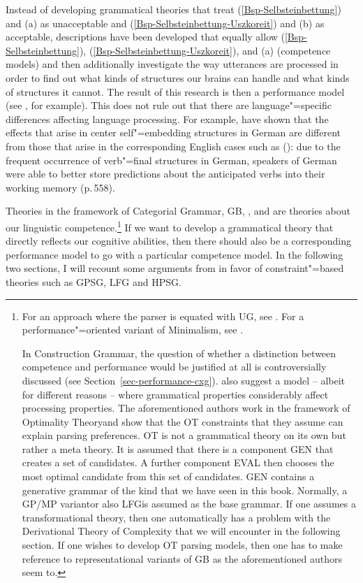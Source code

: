 Instead of developing grammatical theories that treat (\ref{Bsp-Selbsteinbettung}) and (a) as
unacceptable and (\ref{Bsp-Selbsteinbettung-Uszkoreit}) and (b) as acceptable, descriptions
have been developed that equally allow (\ref{Bsp-Selbsteinbettung}),
(\ref{Bsp-Selbsteinbettung-Uszkoreit}), and (a) (competence models) and then additionally
investigate the way utterances are processed in order to find out what kinds of structures our
brains can handle and what kinds of structures it cannot.
The result of this research is then a performance model (see , for example).
This does not rule out that there are language"=specific differences affecting language processing.
For example, \citet*{VSLK2010a} have shown that the effects that arise in center self"=embedding structures in German are different from those
that arise in the corresponding English cases such as ():
due to the frequent occurrence of verb"=final structures in German, speakers of German were able to better store predictions about the
anticipated verbs into their working memory (p.\,558).

Theories in the framework of Categorial Grammar,
GB\indexgb, \lfg, \gpsg and \hpsg are theories about our linguistic competence.\footnote{%
  For an approach where the parser is equated with UG, see .
  For a performance"=oriented variant of Minimalism, see .

  In Construction Grammar\indexcxg, the question of whether a distinction between competence and
  performance would be justified at all is controversially discussed (see Section~\ref{sec-performance-cxg}).
  \citet*{FSCK99a} also suggest a model -- albeit for different reasons -- where grammatical properties considerably affect
  processing properties. The aforementioned authors work in the framework of Optimality Theory\indexot and show that the OT constraints that
  they assume can explain parsing preferences. OT is not a grammatical theory on its own but rather a meta theory.
  It is assumed that there is a component GEN that creates a set of candidates. A further component EVAL then chooses the most optimal candidate from this set
  of candidates. GEN contains a generative grammar of the kind that we have seen in this book. Normally, a GP/MP variant\indexgb or also LFG\indexlfg is assumed
  as the base grammar. If one assumes a transformational theory, then one automatically has a
  problem with the Derivational Theory of Complexity that
  we will encounter in the following section. If one wishes to develop OT parsing models, then one has to make reference to representational variants of GB
  as the aforementioned authors seem to.%
}
If we want to develop a grammatical theory that directly reflects our cognitive abilities, then there should also be a corresponding performance model to go with
a particular competence model. In the following two sections, I will recount some arguments from \citet{SW2011a} in favor of constraint"=based theories such as
GPSG, LFG and HPSG.

